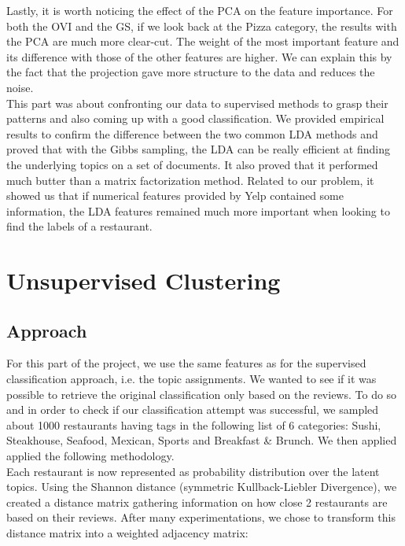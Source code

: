 \documentclass[twoside]{article}
\begin{document}
\begin{multicols}{2}
\noindent Lastly, it is worth noticing the effect of the PCA on the feature importance. For both the OVI and the GS, if we look back at the Pizza category, the results with the PCA are much more clear-cut. The weight of the most important feature and its difference with those of the other features are higher. We can explain this by the fact that the projection gave more structure to the data and reduces the noise.\\

\noindent This part was about confronting our data to supervised methods to grasp their patterns and also coming up with a good classification. We provided empirical results to confirm the difference between the two common LDA methods and proved that with the Gibbs sampling, the LDA can be really efficient at finding the underlying topics on a set of documents.  It also proved that it performed much butter than a matrix factorization method. Related to our problem, it showed us that if numerical features provided by Yelp contained some information, the LDA features remained much more important when looking to find the labels of a restaurant.

\section{Unsupervised Clustering}
\subsection{Approach}

For this part of the project, we use the same features as for the supervised classification approach, i.e. the topic assignments. We wanted to see if it was possible to retrieve the original classification only based on the reviews. To do so and in order to check if our classification attempt was successful, we sampled about 1000 restaurants having tags in the following list of 6 categories: Sushi, Steakhouse, Seafood, Mexican, Sports and Breakfast \& Brunch. We then applied applied the following methodology.\\

Each restaurant is now represented as probability distribution over the latent topics. Using the Shannon distance (symmetric Kullback-Liebler Divergence), we created a distance matrix gathering information on how close 2 restaurants are based on their reviews. After many experimentations, we chose to transform this distance matrix into a weighted adjacency matrix:\\


\end{multicols}
\end{document}
